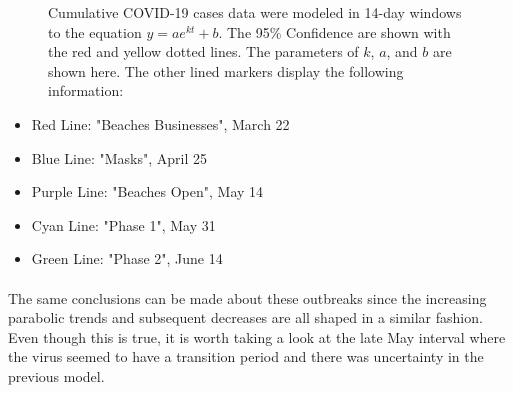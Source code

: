 \documentclass[12pt]{article}
\begin{document}
\begin{figure}[h]
  \centering
  \hfill
  \hfill
  \caption{Cumulative COVID-19 cases data were modeled in 14-day windows to the equation $y=ae^{kt}+b$. The 95\% Confidence are shown with the red and yellow dotted lines. The parameters of $k$, $a$, and $b$ are shown here. The other lined markers display the following information:}
  \label{fig:12}
\end{figure}
\begin{itemize}
  \item Red Line: "Beaches Businesses", March 22
  \item Blue Line: "Masks", April 25
  \item Purple Line: "Beaches Open", May 14
  \item Cyan Line: "Phase 1", May 31
  \item Green Line: "Phase 2", June 14
\end{itemize}

\paragraph{} The same conclusions can be made about these outbreaks since the increasing parabolic trends and subsequent decreases are all shaped in a similar fashion. Even though this is true, it is worth taking a look at the late May interval where the virus seemed to have a transition period and there was uncertainty in the previous model.
\end{document}
